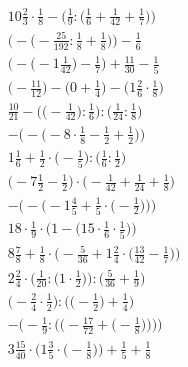 \documentclass[8pt]{article}
\begin{document}
\begin{align}
10\frac{2}{3} \cdot \frac{1}{8} - \Big(\frac{1}{9} : \big(\frac{1}{6} + \frac{1}{42} + \frac{1}{7}\big)\Big) \\
\Big(-\big(-\frac{25}{192} : \frac{1}{8} + \frac{1}{8}\big)\Big) - \frac{1}{6} \\
\Big(-\big(-1\frac{1}{42}\big) - \frac{1}{7}\Big) + \frac{11}{30} - \frac{1}{5} \\
\big(-\frac{11}{12}\big) - \big(0 + \frac{1}{4}\big) - \big(1\frac{2}{6} \cdot \frac{1}{8}\big) \\
\frac{10}{21} - \Big(\big(-\frac{1}{42}\big) : \frac{1}{6}\Big) : \Big(\frac{1}{24} : \frac{1}{8}\Big) \\
-\Big(-\big(-8 \cdot \frac{1}{8} - \frac{1}{2} + \frac{1}{2}\big)\Big) \\
1\frac{1}{6} + \frac{1}{2} \cdot \big(-\frac{1}{5}\big) : \big(\frac{1}{6} : \frac{1}{2}\big) \\
\big(-7\frac{1}{2} - \frac{1}{2}\big) \cdot \big(-\frac{1}{42} + \frac{1}{24} + \frac{1}{8}\big) \\
-\bigg(-\Big(-1\frac{4}{5} + \frac{1}{5} \cdot \big(-\frac{1}{2}\big)\Big)\bigg) \\
18 \cdot \frac{1}{9} \cdot \Big(1 - \big(15 \cdot \frac{1}{6} \cdot \frac{1}{5}\big)\Big) \\
8\frac{7}{8} + \frac{1}{8} \cdot \Big(-\frac{5}{36} + 1\frac{2}{4} \cdot \big(\frac{13}{42} - \frac{1}{7}\big)\Big) \\
2\frac{2}{4} \cdot \Big(\frac{1}{20} : \big(1 \cdot \frac{1}{2}\big)\Big) : \Big(\frac{5}{36} + \frac{1}{9}\Big) \\
\Big(-\frac{2}{4} \cdot \frac{1}{2}\Big) : \Big(\big(-\frac{1}{2}\big) + \frac{1}{4}\Big) \\
-\Bigg(-\frac{1}{9} : \bigg(\Big(-\frac{17}{72} + \big(-\frac{1}{8}\big)\Big)\bigg)\Bigg) \\
3\frac{15}{40} \cdot \Big(1\frac{3}{5} \cdot \big(-\frac{1}{8}\big)\Big) + \frac{1}{5} + \frac{1}{8}
\end{align}
\end{document}
